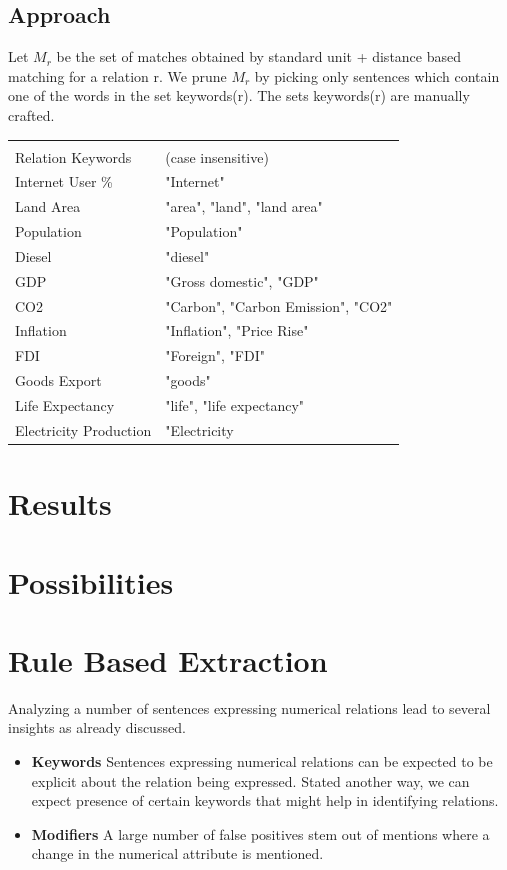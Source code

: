 \documentclass[a4paper,10pt]{article}
\begin{document}
\subsection{Approach}
Let $M_r$ be the set of matches obtained by standard unit + distance based matching for a relation r.
We prune $M_r$ by picking only sentences which contain one of the words in the set keywords(r).
The sets keywords(r) are manually crafted.

\begin{center}
 \begin{tabular}{|l|l|}
\hline \\
 Relation Keywords & (case insensitive)\\
\hline
 Internet User \% &"Internet"\\
Land Area &"area", "land", "land area"\\
Population &"Population"\\
Diesel &"diesel"\\
GDP &"Gross domestic", "GDP"\\
CO2 &"Carbon", "Carbon Emission", "CO2"\\
Inflation &"Inflation", "Price Rise"\\
FDI &"Foreign", "FDI"\\
Goods Export & "goods"\\
Life Expectancy & "life", "life expectancy"\\
Electricity Production & "Electricity\\
\hline
\end{tabular}
 \end{center}



\section{Results}

\section{Possibilities}

\section{Rule Based Extraction}
Analyzing a number of sentences expressing numerical relations lead to several insights as already discussed.

\begin{itemize}
 \item \textbf{Keywords} Sentences expressing numerical relations can be expected to be explicit about the relation being expressed.
 Stated another way, we can expect presence of certain keywords that might help in identifying relations.
 \item \textbf{Modifiers} A large number of false positives stem out of mentions where a change in the numerical attribute is mentioned.
\end{itemize}
\end{document}
